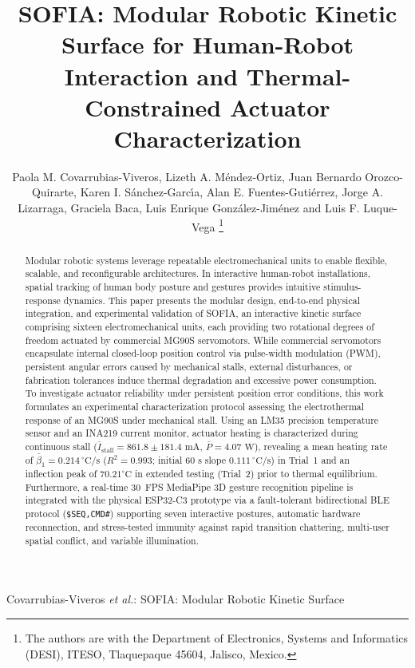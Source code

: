 \documentclass[lettersize,journal]{IEEEtran}
\begin{document}
	
	\title{SOFIA: Modular Robotic Kinetic Surface for Human-Robot Interaction and Thermal-Constrained Actuator Characterization}
	
	\author{Paola M. Covarrubias-Viveros, Lizeth A. M{\'e}ndez-Ortiz, Juan Bernardo Orozco-Quirarte, Karen I. S{\'a}nchez-Garc{\'\i}a, Alan E. Fuentes-Guti{\'e}rrez, Jorge A. Lizarraga, Graciela Baca, Luis Enrique Gonz{\'a}lez-Jim{\'e}nez and Luis F. Luque-Vega
		\thanks{The authors are with the Department of Electronics, Systems and
			Informatics (DESI), ITESO, Tlaquepaque 45604, Jalisco, Mexico.}}
	
	{Covarrubias-Viveros \MakeLowercase{\textit{et al.}}: SOFIA: Modular Robotic Kinetic Surface}
	
	\maketitle
	
	\begin{abstract}
		Modular robotic systems leverage repeatable electromechanical units to enable flexible, scalable, and reconfigurable architectures. In interactive human-robot installations, spatial tracking of human body posture and gestures provides intuitive stimulus-response dynamics. This paper presents the modular design, end-to-end physical integration, and experimental validation of SOFIA, an interactive kinetic surface comprising sixteen electromechanical units, each providing two rotational degrees of freedom actuated by commercial MG90S servomotors. While commercial servomotors encapsulate internal closed-loop position control via pulse-width modulation (PWM), persistent angular errors caused by mechanical stalls, external disturbances, or fabrication tolerances induce thermal degradation and excessive power consumption. To investigate actuator reliability under persistent position error conditions, this work formulates an experimental characterization protocol assessing the electrothermal response of an MG90S under mechanical stall. Using an LM35 precision temperature sensor and an INA219 current monitor, actuator heating is characterized during continuous stall ($\bar{I}_{\text{stall}} = 861.8 \pm 181.4\text{ mA}$, $\bar{P} = 4.07\text{ W}$), revealing a mean heating rate of $\bar{\beta}_1 = 0.214\,^\circ\text{C/s}$ ($R^2 = 0.993$; initial $60\text{ s}$ slope $0.111\,^\circ\text{C/s}$) in Trial~1 and an inflection peak of $70.21^\circ\text{C}$ in extended testing (Trial~2) prior to thermal equilibrium. Furthermore, a real-time 30~FPS MediaPipe 3D gesture recognition pipeline is integrated with the physical ESP32-C3 prototype via a fault-tolerant bidirectional BLE protocol (\texttt{\$SEQ,CMD\#}) supporting seven interactive postures, automatic hardware reconnection, and stress-tested immunity against rapid transition chattering, multi-user spatial conflict, and variable illumination.
	\end{abstract}
	
\end{document}
